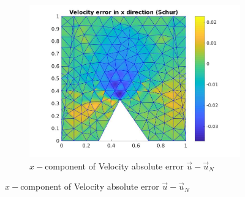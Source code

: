 \documentclass[graybox]{svmult}
\begin{document}
\begin{figure}
\begin{subfigure}{0.31\textwidth}
\includegraphics[width=\linewidth]{velocity_error_1_at_47_33.jpg}
\caption{$x-$component of Velocity absolute error $\overrightarrow{u}-\overrightarrow{u}_N$} \label{error_x_vel}
\end{subfigure}


\end{figure}
\end{document}
